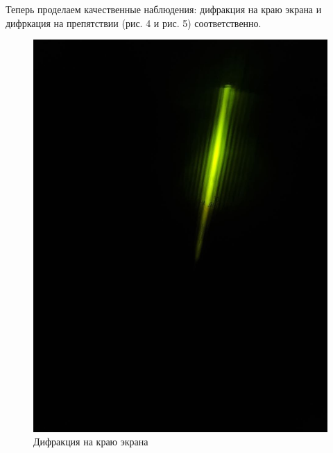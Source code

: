 \documentclass[a4paper,12pt]{article}
\begin{document}
\newpage
\noindent
Теперь проделаем качественные наблюдения: дифракция на краю экрана и дифркация на препятствии (рис. 4 и рис. 5) соответственно.

\begin{figure}[H]
    \centering
    \includegraphics[scale=0.2]{pic_2.png}
    \caption{Дифракция на краю экрана}
\end{figure}
\end{document}
